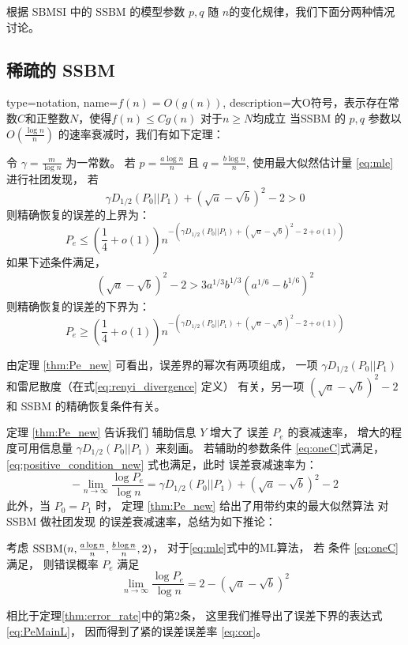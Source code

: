 根据 SBMSI 中的 SSBM 的模型参数 $p,q$ 随 $n$的变化规律，我们下面分两种情况讨论。
\subsection{稀疏的 SSBM }
{
  type=notation,
  name={$f(n)=O(g(n))$},
  description={大O符号，表示存在常数$C$和正整数$N$，使得$f(n)\leq C g(n)$ 对于$n\geq N$均成立}
}
当SSBM 的 $p,q$ 参数以 $O(\frac{ \log n}{n})$
的速率衰减时，我们有如下定理：
\begin{theorem}\label{thm:Pe_new}
    令
    $\gamma = \frac{ m}{\log n}$
    为一常数。
    若
    $p = \frac{a \log n }{n} $ 且 $q = 
    \frac{b \log n } {n}$, 使用最大似然估计量 \eqref{eq:mle}
    进行社团发现，
    若
    \begin{equation}\label{eq:positive_condition_new}
    \gamma D_{1/2}(P_0||P_1) +
     (\sqrt{a} - \sqrt{b})^2-2 > 0
    \end{equation}
    则精确恢复的误差的上界为：
    \begin{equation}\label{eq:PeMain}
    P_e \leq (\frac{1}{4}+o(1)) n^{-\left(\gamma D_{1/2}(P_0||P_1) + (\sqrt{a} - \sqrt{b})^2-2 + o(1)\right) }
    \end{equation}
    如果下述条件满足，
    \begin{align}
    (\sqrt{a}-\sqrt{b})^2-2 
    > 3a^{1/3}b^{1/3}(a^{1/6}-b^{1/6})^2\label{eq:oneC}
    \end{align}
    则精确恢复的误差的下界为：
    \begin{equation}\label{eq:PeMainL}
    P_e \geq (\frac{1}{4}+o(1)) n^{-\left(\gamma D_{1/2}(P_0||P_1) + (\sqrt{a} - \sqrt{b})^2-2 + o(1)\right)}
    \end{equation}
\end{theorem}

由定理 \ref{thm:Pe_new}
可看出，误差界的幂次有两项组成，
一项 $\gamma D_{1/2}(P_0||P_1) $ 
和雷尼散度（在式\eqref{eq:renyi_divergence} 定义）
有关，另一项 $ (\sqrt{a} - \sqrt{b})^2-2 $
和 SSBM 的精确恢复条件有关。

定理
\ref{thm:Pe_new} 告诉我们
辅助信息  $Y$  增大了 误差 $P_e$ 的衰减速率，
增大的程度可用信息量 $\gamma D_{1/2}(P_0||P_1)$ 
来刻画。
若辅助的参数条件 \eqref{eq:oneC}式满足，
\eqref{eq:positive_condition_new} 式也满足，此时
误差衰减速率为：
$$
-\lim_{n\to \infty} \frac{\log P_e}{\log n}
= \gamma D_{1/2}(P_0||P_1) + (\sqrt{a} - \sqrt{b})^2-2
$$
此外，当 $P_0=P_1$ 时，
定理 \ref{thm:Pe_new} 
给出了用带约束的最大似然算法
对SSBM 做社团发现
的误差衰减速率，总结为如下推论：
\begin{corollary}\label{cor:sbm}
考虑
$\operatorname{SSBM}(n,\frac{a\log n}{n}, \frac{b \log n}{n}, 2)$，
对于\eqref{eq:mle}式中的ML算法， 
若 条件 \eqref{eq:oneC} 满足，
则错误概率 $P_e$ 满足
\begin{equation}\label{eq:cor}
\lim_{n\to \infty} \frac{\log P_e}{\log n} =2-(\sqrt{a} - \sqrt{b})^2
\end{equation}

\end{corollary}
相比于定理\ref{thm:error_rate}中的第2条，
这里我们推导出了误差下界的表达式 \eqref{eq:PeMainL}，
因而得到了紧的误差误差率 \eqref{eq:cor}。

